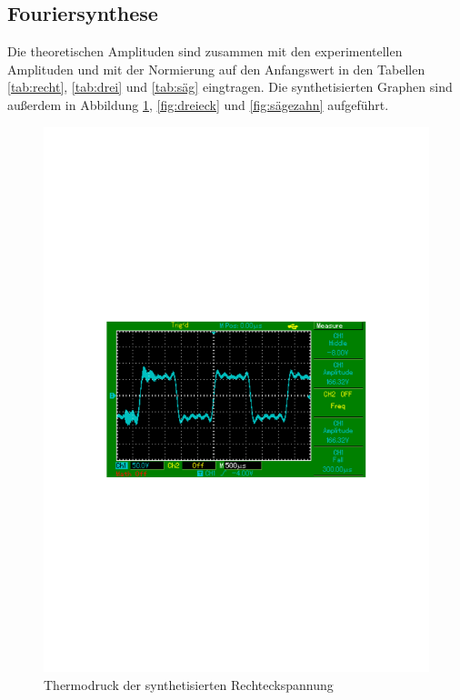 



\newpage
\subsection{Fouriersynthese}
Die theoretischen Amplituden sind zusammen mit den experimentellen Amplituden und mit der Normierung auf den Anfangswert in den Tabellen \ref{tab:recht}, \ref{tab:drei} und \ref{tab:säg} eingtragen.
Die synthetisierten Graphen sind außerdem in Abbildung \ref{fig:rechteck}, \ref{fig:dreieck} und \ref{fig:sägezahn} aufgeführt.


\begin{figure}[h!]
  \centering
  \includegraphics[width=\textwidth]{rechteck.pdf}
  \caption{Thermodruck der synthetisierten Rechteckspannung}
  \label{fig:rechteck}
\end{figure}

